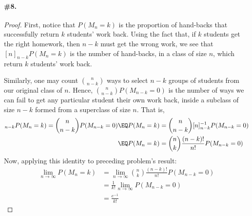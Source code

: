 \documentclass[12pt,titlepage]{article}
\begin{document}
\paragraph{\#8.}
\begin{proof} 
First, notice that $P(M_{n} = k)$ is the proportion of hand-backs that successfully return $k$ students' work back. Using the fact that, if $k$ students get the right homework, then $n-k$ must get the wrong work, we see that $ [n]_{n-k} P(M_n = k)$ is the number of hand-backs, in a class of size $n$, which return $k$ students' work back. 

Similarly, one may count $\binom{n}{n-k}$ ways to select $n-k$ groups of students from our original class of $n$. Hence, $\binom{n}{n-k} P(M_{n-k}=0)$ is the number of ways we can fail to get any particular student their own work back, inside a subclass of size $n-k$ formed from a superclass of size $n$. That is, 
\begin{align*}
[n]_{n-k} P(M_n = k) = \binom{n}{n-k} P(M_{n-k}=0) &\EQ P(M_n = k) = \binom{n}{n-k} [n]_{n-k}^{-1} P(M_{n-k}=0) \\
&\EQ P(M_n = k) = \binom{n}{k} \frac{(n-k)!}{n!} P(M_{n-k}=0)
\end{align*}
Now, applying this identity to preceding problem's result:
\begin{align*}
\lim_{n\to\infty} P(M_n =k) &= \lim_{n\to\infty}\binom{n}{k} \frac{(n-k)!}{n!} P(M_{n-k}=0) \\
&= \frac{1}{k!} \lim_{n\to\infty}P(M_{n-k}=0) \\
&= \frac{e^{-1}}{k!}
\end{align*}
\end{proof}
\end{document}
